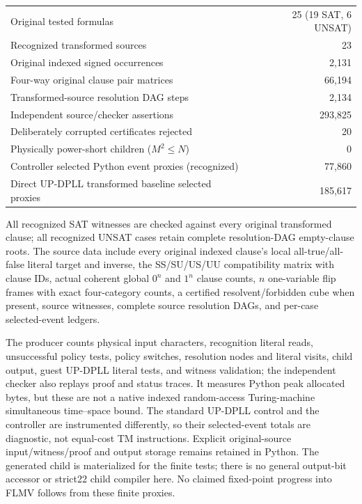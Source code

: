 \documentclass[11pt]{article}
\begin{document}
\begin{center}\begin{tabular}{lr}\toprule
Original tested formulas &25 (19 SAT, 6 UNSAT)\\
Recognized transformed sources &23\\
Original indexed signed occurrences &2,131\\
Four-way original clause pair matrices &66,194\\
Transformed-source resolution DAG steps &2,134\\
Independent source/checker assertions &293,825\\
Deliberately corrupted certificates rejected &20\\
Physically power-short children ($M^2\le N$) &0\\
Controller selected Python event proxies (recognized) &77,860\\
Direct UP-DPLL transformed baseline selected proxies &185,617\\
\bottomrule\end{tabular}\end{center}
All recognized SAT witnesses are checked against every original transformed clause; all recognized UNSAT cases retain complete resolution-DAG empty-clause roots. The source data include every original indexed clause's local all-true/all-false literal target and inverse, the SS/SU/US/UU compatibility matrix with clause IDs, actual coherent global $0^n$ and $1^n$ clause counts, $n$ one-variable flip frames with exact four-category counts, a certified resolvent/forbidden cube when present, source witnesses, complete source resolution DAGs, and per-case selected-event ledgers.

The producer counts physical input characters, recognition literal reads, unsuccessful policy tests, policy switches, resolution nodes and literal visits, child output, guest UP-DPLL literal tests, and witness validation; the independent checker also replays proof and status traces. It measures Python peak allocated bytes, but these are not a native indexed random-access Turing-machine simultaneous time--space bound. The standard UP-DPLL control and the controller are instrumented differently, so their selected-event totals are diagnostic, not equal-cost TM instructions. Explicit original-source input/witness/proof and output storage remains retained in Python. The generated child is materialized for the finite tests; there is no general output-bit accessor or strict22 child compiler here. No claimed fixed-point progress into FLMV follows from these finite proxies.
\end{document}
